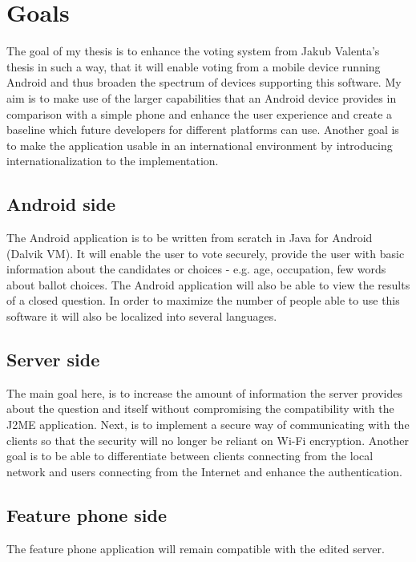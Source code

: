 \documentclass[11pt,twoside,a4paper]{book}
\begin{document}
\section{Goals}

The goal of my thesis is to enhance the voting system from Jakub Valenta's\cite{bakalarkaJV} thesis in such a way, that it will enable voting from a mobile device running Android\cite{whatisAnd} and thus broaden the spectrum of devices supporting this software. My aim is to make use of the larger capabilities that an Android device provides in comparison with a simple phone and enhance the user experience and create a baseline which future developers for different platforms can use. Another goal is to make the application usable in an international environment by introducing internationalization to the implementation.

\subsection{Android side}
The Android application is to be written from scratch in Java for Android (Dalvik VM\cite{DalvikVM}). It will enable the user to vote securely, provide the user with basic information about the candidates or choices - e.g. age, occupation, few words about ballot choices. The Android application will also be able to view the results of a closed question. In order to maximize the number of people able to use this software it will also be localized into several languages.

\subsection{Server side}
The main goal here, is to increase the amount of information the server provides about the question and itself without compromising the compatibility with the J2ME application. Next, is to implement a secure way of communicating with the clients so that the security will no longer be reliant on Wi-Fi encryption. Another goal is to be able to differentiate between clients connecting from the local network and users connecting from the Internet and enhance the authentication.




\subsection{Feature phone side}
The feature phone application will remain compatible with the edited server. \\
\end{document}

